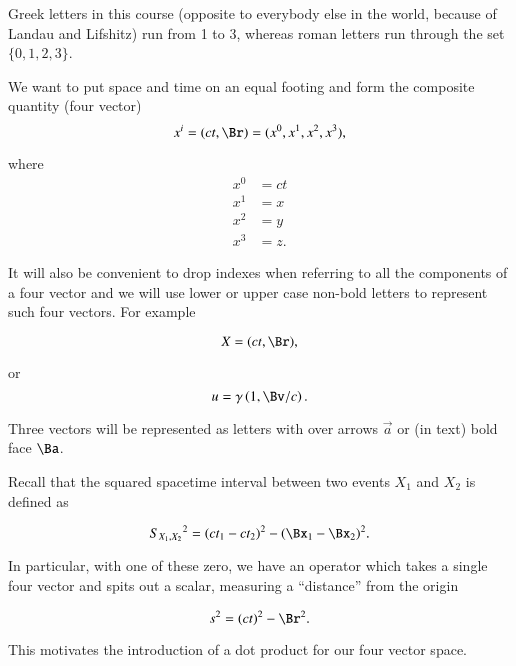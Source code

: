 Greek letters in this course (opposite to everybody else in the world, because of Landau and Lifshitz) run from 1 to 3, whereas roman letters run through the set $\{0,1,2,3\}$.

We want to put space and time on an equal footing and form the composite quantity (four vector) 
\begin{equation}\label{eqn:relativisticElectrodynamicsT1:40}
x^i = (ct, \Br) = (x^0, x^1, x^2, x^3),
\end{equation}

where
\begin{align}\label{eqn:relativisticElectrodynamicsT1:80}
x^0 &= ct \\
x^1 &= x \\
x^2 &= y \\
x^3 &= z.
\end{align}

It will also be convenient to drop indexes when referring to all the components of a four vector and we will use lower or upper case non-bold letters to represent such four vectors.  For example

\begin{equation}\label{eqn:relativisticElectrodynamicsT1:81}
X = (ct, \Br),
\end{equation}

or
\begin{equation}\label{eqn:relativisticElectrodynamicsT1:82}
u = \gamma \left(1, \Bv/c \right).
\end{equation}

Three vectors will be represented as letters with over arrows $\vec{a}$ or (in text) bold face $\Ba$.

Recall that the squared spacetime interval between two events $X_1$ and $X_2$ is defined as

\begin{equation}\label{eqn:relativisticElectrodynamicsT1:60}
{S_{X_1, X_2}}^2 = (ct_1 - c t_2)^2 - (\Bx_1 - \Bx_2)^2.
\end{equation}

In particular, with one of these zero, we have an operator which takes a single four vector and spits out a scalar, measuring a ``distance'' from the origin

\begin{equation}\label{eqn:relativisticElectrodynamicsT1:30}
s^2 = (ct)^2 - \Br^2.
\end{equation}

This motivates the introduction of a dot product for our four vector space.  

